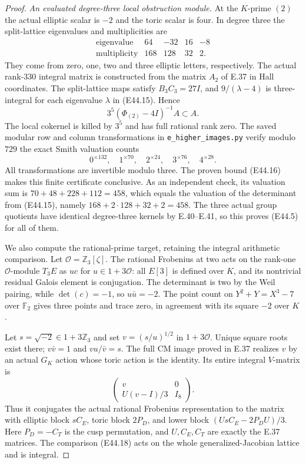 \begin{proof}
\emph{An evaluated degree-three local obstruction module.}
At the $K$-prime $(2)$ the actual
elliptic scalar is $-2$ and the
toric scalar is four. In degree
three the split-lattice eigenvalues
and multiplicities are
\[
\begin{array}{c|rrrr}
 \text{eigenvalue}&64&-32&16&-8\\\hline
 \text{multiplicity}&168&128&32&2.
\end{array}
 \tag{E44.15}
\]
They come from zero, one, two and
three elliptic letters, respectively.
The actual rank-$330$ integral
matrix is constructed from the
matrix $A_2$ of E.37 in Hall
coordinates. The split-lattice
maps satisfy $B_3C_3=27I$, and
$9/(\lambda-4)$ is three-integral
for each eigenvalue $\lambda$ in
(E44.15). Hence
\[
 3^5(\Phi_{(2)}-4I)^{-1}A\subset A.
 \tag{E44.16}
\]
The local cokernel is killed by
$3^5$ and has full rational rank
zero. The saved modular row and
column transformations in
\texttt{e\_higher\_images.py}
verify modulo $729$ the exact
Smith valuation counts
\[
 0^{\times132},\quad1^{\times70},\quad
 2^{\times24},\quad3^{\times76},\quad4^{\times28}.
 \tag{E44.17}
\]
All transformations are invertible
modulo three. The proven bound
(E44.16) makes this finite
certificate conclusive. As an
independent check, its valuation
sum is
$70+48+228+112=458$, which equals
the valuation of the determinant
from (E44.15), namely
$168+2\cdot128+32+2=458$.
The three actual group quotients
have identical degree-three
kernels by E.40--E.41, so this
proves (E44.5) for all of them.

We also compute the rational-prime
target, retaining the integral
arithmetic comparison. Let
$\mathcal O=\mathbb Z_3[\zeta]$.
The rational Frobenius at two
acts on the rank-one
$\mathcal O$-module $T_3E$ as
$u c$ for $u\in1+3\mathcal O$:
all $E[3]$ is defined over $K$,
and its nontrivial residual
Galois element is conjugation.
The determinant is two by the
Weil pairing, while $\det(c)=-1$,
so $u\bar u=-2$. The point count
on $Y^2+Y=X^3-7$ over
$\mathbb F_2$ gives three points
and trace zero, in agreement
with its square $-2$ over $K$.

Let $s=\sqrt{-2}\in1+3\mathbb Z_3$
and set $v=(s/u)^{1/2}$ in
$1+3\mathcal O$. Unique square
roots exist there; $v\bar v=1$
and $v u/\bar v=s$. The full
CM image proved in E.37 realizes
$v$ by an actual $G_K$ action
whose toric action is the
identity. Its entire integral
$V$-matrix is
\[
 \begin{pmatrix}
 v&0\\ U(v-I)/3&I_8
 \end{pmatrix}.
 \tag{E44.18}
\]
Thus it conjugates the actual
rational Frobenius representation
to the matrix with elliptic
block $sC_E$, toric block $2P_D$,
and lower block
$(UsC_E-2P_DU)/3$. Here
$P_D=-C_T$ is the cusp
permutation, and $U,C_E,C_T$
are exactly the E.37 matrices.
The comparison (E44.18) acts
on the whole generalized-Jacobian
lattice and is integral.


\end{proof}
